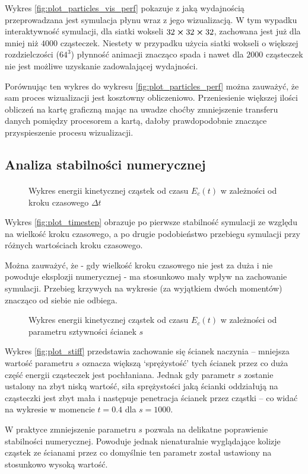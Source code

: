 \par
Wykres \eqref{fig:plot_particles_vis_perf} pokazuje z jaką wydajnością przeprowadzana jest symulacja płynu wraz z jego wizualizacją. W tym wypadku interaktywność symulacji, dla siatki wokseli $32\cross32\cross32$, zachowana jest już dla mniej niż $4000$ cząsteczek. Niestety w przypadku użycia siatki wokseli o większej rozdzielczości ($64^3$) płynność animacji znacząco spada i nawet dla $2000$ cząsteczek nie jest możliwe uzyskanie zadowalającej wydajności.
\par
Porównując ten wykres do wykresu \eqref{fig:plot_particles_perf} można zauważyć, że sam proces wizualizacji jest kosztowny obliczeniowo. Przeniesienie większej ilości obliczeń na kartę graficzną mając na uwadze choćby zmniejszenie transferu danych pomiędzy procesorem a kartą, dałoby prawdopodobnie znaczące przyspieszenie procesu wizualizacji.


\subsection{Analiza stabilności numerycznej}

\paragraph{}
\begin{figure}[H]

\caption{Wykres energii kinetycznej cząstek od czasu $E_c(t)$ w zależności od kroku czasowego $\Delta t$}
\label{fig:plot_timestep}
\end{figure}

\par
Wykres \eqref{fig:plot_timestep} obrazuje po pierwsze stabilność symulacji ze względu na wielkość kroku czasowego, a po drugie podobieństwo przebiegu symulacji przy różnych wartościach kroku czasowego.
\par
Można zauważyć, że - gdy wielkość kroku czasowego nie jest za duża i nie powoduje eksplozji numerycznej - ma stosunkowo mały wpływ na zachowanie symulacji. Przebieg krzywych na wykresie (za wyjątkiem dwóch momentów) znacząco od siebie nie odbiega.

\begin{figure}[H]

\caption{Wykres energii kinetycznej cząstek od czasu $E_c(t)$ w zależności od parametru sztywności ścianek $s$}
\label{fig:plot_stiff}
\end{figure}

\par
Wykres \eqref{fig:plot_stiff} przedstawia zachowanie się ścianek naczynia -- mniejsza wartość parametru $s$ oznacza większą `sprężystość' tych ścianek przez co duża część energii cząsteczek jest pochłaniana. Jednak gdy parametr $s$ zostanie ustalony na zbyt niską wartość, siła sprężystości jaką ścianki oddziałują na cząsteczki jest zbyt mała i następuje penetracja ścianek przez cząstki -- co widać na wykresie w momencie $t=0.4$ dla $s=1000$.
\par
W praktyce zmniejszenie parametru $s$ pozwala na delikatne poprawienie stabilności numerycznej. Powoduje jednak nienaturalnie wyglądające kolizje cząstek ze ścianami przez co domyślnie ten parametr został ustawiony na stosunkowo wysoką wartość.
\par